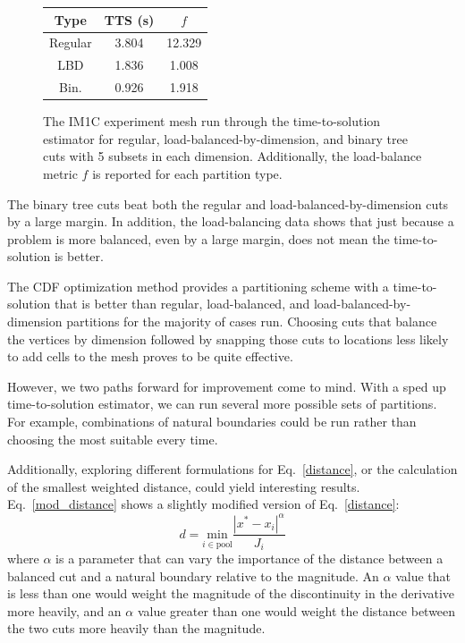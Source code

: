 \documentclass[times,final]{elsarticle}
\begin{document}
\begin{figure}[ht]
\begin{minipage}[c]{0.65\textwidth}
\end{minipage}
%
\begin{minipage}[c]{0.33\textwidth}
\centering
\begin{table}[H]
\centering
\begin{tabular}{c|c|c}
\textbf{Type} & \bf TTS (s) & \bf $f$ \\ \hline
Regular & 3.804 & 12.329\\ \hline
LBD & 1.836 & 1.008\\ \hline
Bin. & 0.926 & 1.918\\ \hline
\end{tabular}
\end{table}
\end{minipage}
\caption{The IM1C experiment mesh run through the time-to-solution estimator for regular, load-balanced-by-dimension, and binary tree cuts with 5 subsets in each dimension. Additionally, the load-balance metric $f$ is reported for each partition type.}
\label{im1c_opt}
\end{figure}
The binary tree cuts beat both the regular and load-balanced-by-dimension cuts by a large margin. In addition, the load-balancing data shows that just because a problem is more balanced, even by a large margin, does not mean the time-to-solution is better.

The CDF optimization method provides a partitioning scheme with a time-to-solution that is better than regular, load-balanced, and load-balanced-by-dimension partitions for the majority of cases run.
Choosing cuts that balance the vertices by dimension followed by snapping those cuts to locations less likely to add cells to the mesh proves to be quite effective.

However, we two paths forward for improvement come to mind.
With a sped up time-to-solution estimator, we can run several more possible sets of partitions.
For example, combinations of natural boundaries could be run rather than choosing the most suitable every time.

Additionally, exploring different formulations for Eq.~\ref{distance}, or the calculation of the smallest weighted distance, could yield interesting results.
Eq.~\ref{mod_distance} shows a slightly modified version of Eq.~\ref{distance}:
\begin{equation}
d = \underset{i \in \text{pool}}{\text{min}} \frac{|x^{*} - x_i|^{\alpha}}{J_i}
\label{mod_distance}
\end{equation}
where $\alpha$ is a parameter that can vary the importance of the distance between a balanced cut and a natural boundary relative to the magnitude. An $\alpha$ value that is less than one would weight the magnitude of the discontinuity in the derivative more heavily, and an $\alpha$ value greater than one would weight the distance between the two cuts more heavily than the magnitude.
\end{document}
